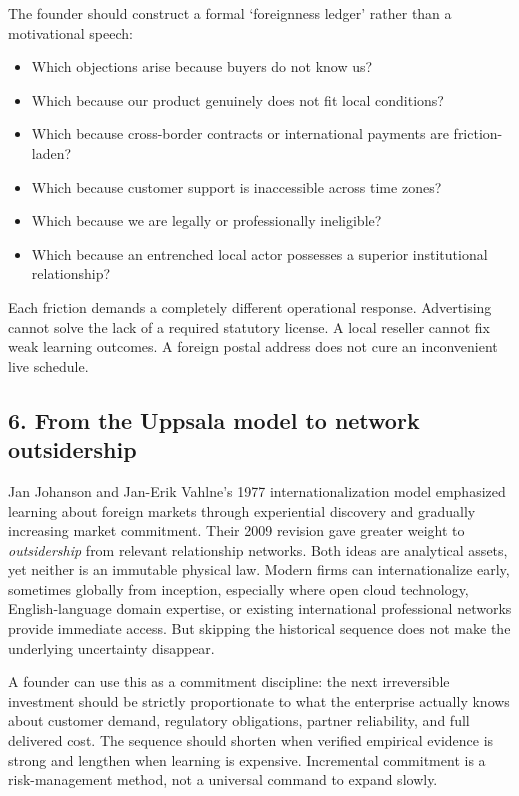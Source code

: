 The founder should construct a formal `foreignness ledger' rather than a motivational speech:
\begin{itemize}
    \item Which objections arise because buyers do not know us?
    \item Which because our product genuinely does not fit local conditions?
    \item Which because cross-border contracts or international payments are friction-laden?
    \item Which because customer support is inaccessible across time zones?
    \item Which because we are legally or professionally ineligible?
    \item Which because an entrenched local actor possesses a superior institutional relationship?
\end{itemize}
Each friction demands a completely different operational response. Advertising cannot solve the lack of a required statutory license. A local reseller cannot fix weak learning outcomes. A foreign postal address does not cure an inconvenient live schedule.

\subsection{6. From the Uppsala model to network outsidership}

Jan Johanson and Jan-Erik Vahlne's 1977 internationalization model emphasized learning about foreign markets through experiential discovery and gradually increasing market commitment. Their 2009 revision gave greater weight to \textit{outsidership} from relevant relationship networks. Both ideas are analytical assets, yet neither is an immutable physical law. Modern firms can internationalize early, sometimes globally from inception, especially where open cloud technology, English-language domain expertise, or existing international professional networks provide immediate access. But skipping the historical sequence does not make the underlying uncertainty disappear.

A founder can use this as a commitment discipline: the next irreversible investment should be strictly proportionate to what the enterprise actually knows about customer demand, regulatory obligations, partner reliability, and full delivered cost. The sequence should shorten when verified empirical evidence is strong and lengthen when learning is expensive. Incremental commitment is a risk-management method, not a universal command to expand slowly.

